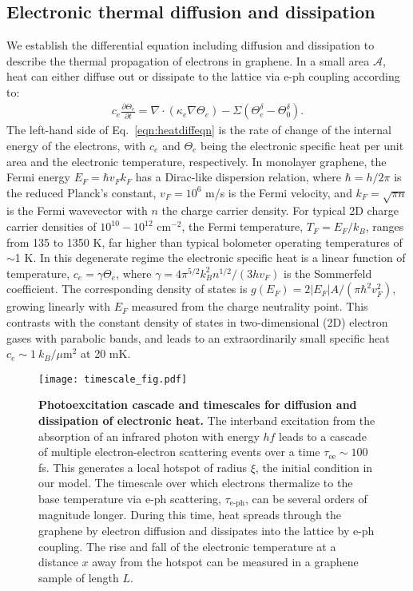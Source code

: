\documentclass[aip, amsmath,amssymb, reprint]{revtex4-1}
\newcommand{\ba}{\begin{eqnarray}}
\newcommand{\ea}{\end{eqnarray}}
\begin{document}
\subsection{Electronic thermal diffusion and dissipation}
We establish the differential equation including diffusion and dissipation to describe the thermal propagation of electrons in graphene. In a small area $\mathcal{A}$, heat can either diffuse out or dissipate to the lattice via e-ph coupling according to:
\ba c_e\frac{\partial\Theta_e}{\partial t} = \nabla\cdot\left(\kappa_e\nabla \Theta_e\right) -\Sigma(\Theta^\delta_e-\Theta^\delta_0). \label{eqn:heatdiffeqn} \ea 
The left-hand side of Eq.\ \ref{eqn:heatdiffeqn} is the rate of change of the internal energy of the electrons, with $c_{e}$ and $\Theta_{e}$ being the electronic specific heat per unit area and the electronic temperature, respectively. In monolayer graphene, the Fermi energy $E_{F}= \hbar v_{F} k_{F}$ has a Dirac-like dispersion relation, where $\hbar = h/2\pi$ is the reduced Planck's constant, $v_F=10^6$ m/s is the Fermi velocity, and $k_F = \sqrt{\pi n}$ is the Fermi wavevector with $n$ the charge carrier density. For typical 2D charge carrier densities of $10^{10}-10^{12}$ cm$^{-2}$, the Fermi temperature, $T_F = E_F/k_B$, ranges from 135 to 1350 K, far higher than typical bolometer operating temperatures of $\sim$1 K. In this degenerate regime the electronic specific heat is a linear function of temperature, $c_e = \gamma \Theta_e$, where $\gamma=4\pi^{5/2}k_B^2 n^{1/2}/(3 h v_F)$ is the Sommerfeld coefficient. The corresponding density of states is $g(E_{F})=2|E_{F}|A/(\pi \hbar^2 v_F^2)$, growing linearly with $E_F$ measured from the charge neutrality point\cite{Sarma.2011}. This contrasts with the constant density of states in two-dimensional (2D) electron gases with parabolic bands, and leads to an extraordinarily small specific heat $c_e \sim 1 ~k_B/\mu$m$^2$ at 20 mK. 

\begin{figure}[t]\centering
\texttt{[image: timescale\_fig.pdf]}
\caption{\textbf{Photoexcitation cascade and timescales for diffusion and dissipation of electronic heat.} The interband excitation from the absorption of an infrared photon with energy $hf$ leads to a cascade of multiple electron-electron scattering events over a time $\tau_{\text{ee}}\sim100$ fs. This generates a local hotspot of radius $\xi$, the initial condition in our model. The timescale over which electrons thermalize to the base temperature via e-ph scattering, $\tau_{\text{e-ph}}$, can be several orders of magnitude longer. During this time, heat spreads through the graphene by electron diffusion and dissipates into the lattice by e-ph coupling. The rise and fall of the electronic temperature at a distance $x$ away from the hotspot can be measured in a graphene sample of length $L$.}
\label{fig:cascade+timescale}
\end{figure}
\end{document}
